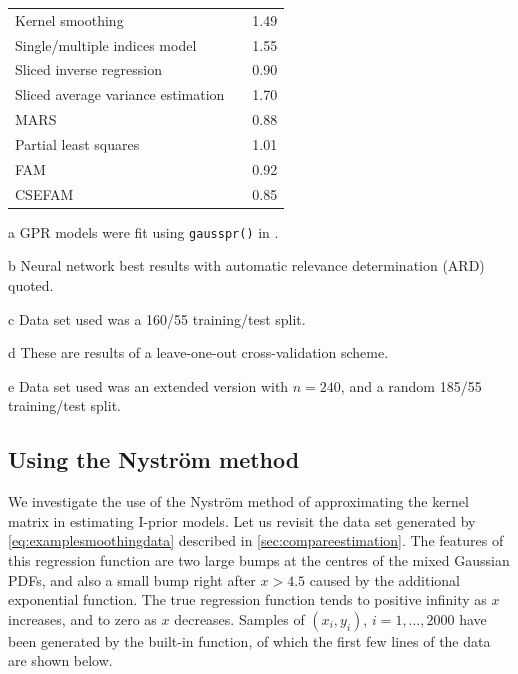 \documentclass[showframe,11pt,twoside,openright]{report}\usepackage[]{graphicx}\usepackage[]{color}
\begin{document}
\begin{table}[b!]
\begin{threeparttable}
\begin{tabular}{p{7cm}rr}
\hspace{0.5em} Kernel smoothing\tnote{c}                   && 1.49 \\
\hspace{0.5em} Single/multiple indices model\tnote{d}      && 1.55
\\[0.5em]
\hspace{0.5em} Sliced inverse regression                   && 0.90 \\
\hspace{0.5em} Sliced average variance estimation          && 1.70 \\
\hspace{0.5em} MARS\tnote{e}                               && 0.88
\\[0.5em]
\hspace{0.5em} Partial least squares\tnote{e}              && 1.01 \\
\hspace{0.5em} FAM\tnote{e}                                && 0.92 \\
\hspace{0.5em} CSEFAM\tnote{e}                             && 0.85 \\
\bottomrule
\end{tabular}
\begin{tablenotes}\footnotesize
\item [a] GPR models were fit using \texttt{gausspr()} in .
\item [b] Neural network best results with automatic relevance determination (ARD) quoted.
\item [c] Data set used was a 160/55 training/test split.
\item [d] These are results of a leave-one-out cross-validation scheme.
\item [e] Data set used was an extended version with $n=240$, and a random 185/55 training/test split.
\end{tablenotes}
\end{threeparttable}
\end{table}

\subsection[Using the Nystrom method]{Using the Nystr\"om method}

We investigate the use of the Nystr\"om method of approximating the kernel matrix in estimating I-prior models.
Let us revisit the data set generated by \cref{eq:examplesmoothingdata} described in \cref{sec:compareestimation}.
The features of this regression function are two large bumps at the centres of the mixed Gaussian PDFs, and also a small bump right after $x>4.5$ caused by the additional exponential function.
The true regression function tends to positive infinity as $x$ increases, and to zero as $x$ decreases.
Samples of $(x_i,y_i)$, $i=1,\dots,2000$ have been generated by the built-in  function, of which the first few lines of the data are shown below.
\end{document}
